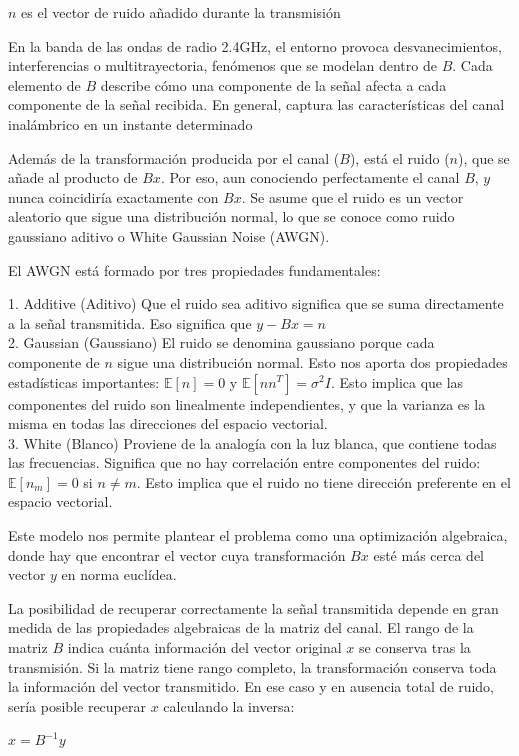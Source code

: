\documentclass[letterpaper,12pt]{article}
\begin{document}
$n$ es el vector de ruido añadido durante la transmisión

En la banda de las ondas de radio 2.4GHz, el entorno provoca desvanecimientos, interferencias o
multitrayectoria, fenómenos que se modelan dentro de $B$. Cada elemento de $B$ describe cómo una
componente de la señal afecta a cada componente de la señal recibida. En general, captura las
características del canal inalámbrico en un instante determinado





\newpage
{}
Además de la transformación producida por el canal ($B$), está el ruido ($n$), que se añade al producto
de $Bx$. Por eso, aun conociendo perfectamente el canal $B$, $y$ nunca coincidiría exactamente con
$Bx$. Se asume que el ruido es un vector aleatorio que sigue una distribución normal, lo que se
conoce como ruido gaussiano aditivo o White Gaussian Noise (AWGN).

El AWGN está formado por tres propiedades fundamentales:

   1. Additive (Aditivo)
      Que el ruido sea aditivo significa que se suma directamente a la señal transmitida. Eso
      significa que $y-Bx=n$ \\

   2. Gaussian (Gaussiano)
      El ruido se denomina gaussiano porque cada componente de $n$ sigue una distribución
      normal. Esto nos aporta dos propiedades estadísticas importantes: $\mathbb{E}[n]=0$ y $\mathbb{E}[nn^T]=\sigma^2I$.
      Esto implica que las componentes del ruido son linealmente independientes, y que la
      varianza es la misma en todas las direcciones del espacio vectorial. \\

   3. White (Blanco)
      Proviene de la analogía con la luz blanca, que contiene todas las frecuencias. Significa
      que no hay correlación entre componentes del ruido: $\mathbb{E}[n_m]=0$ si $n\neq m$. Esto
      implica que el ruido no tiene dirección preferente en el espacio vectorial.

Este modelo nos permite plantear el problema como una optimización algebraica, donde hay que
encontrar el vector cuya transformación $Bx$ esté más cerca del vector $y$ en norma euclídea.

La posibilidad de recuperar correctamente la señal transmitida depende en gran medida de las
propiedades algebraicas de la matriz del canal. El rango de la matriz $B$ indica cuánta información
del vector original $x$ se conserva tras la transmisión. Si la matriz tiene rango completo, la
transformación conserva toda la información del vector transmitido. En ese caso y en ausencia
total de ruido, sería posible recuperar $x$ calculando la inversa: \centerline{$x=B^{-1}y$}
\end{document}
